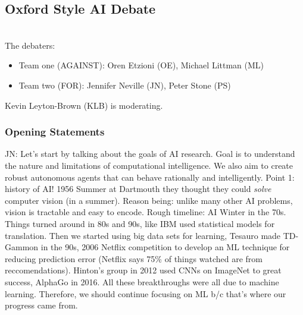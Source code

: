 
\spacerule
\subsection{Oxford Style AI Debate}

 \\

The debaters:
\begin{itemize}
    \item Team one (AGAINST): Oren Etzioni (OE), Michael Littman (ML)
    \item Team two (FOR): Jennifer Neville (JN), Peter Stone (PS)
\end{itemize}

Kevin Leyton-Brown (KLB) is moderating. \\

\subsubsection{Opening Statements}

JN: Let's start by talking about the goals of AI research. Goal is to understand the nature and limitations of computational intelligence. We also aim to create robust autonomous agents that can behave rationally and intelligently. Point 1: history of AI! 1956 Summer at Dartmouth they thought they could {\it solve} computer vision (in a summer). Reason being: unlike many other AI problems, vision is tractable and easy to encode. Rough timeline:
AI Winter in the 70s. Things turned around in 80s and 90s, like IBM used statistical models for translation. Then we started using big data sets for learning, Tesauro made TD-Gammon in the 90s, 2006 Netflix competition to develop an ML technique for reducing prediction error (Netflix says 75\% of things watched are from reccomendations). Hinton's group in 2012 used CNNs on ImageNet to great success, AlphaGo in 2016. All these breakthroughs were all due to machine learning. Therefore, we should continue focusing on ML b/c that's where our progress came from. \\

